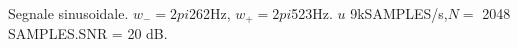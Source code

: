 Segnale sinusoidale. $w_{-}=2pi$262Hz, $w_{+}=2pi$523Hz. $
u$ 9kSAMPLES/s,$N=$ 2048 SAMPLES.SNR = 20 dB.